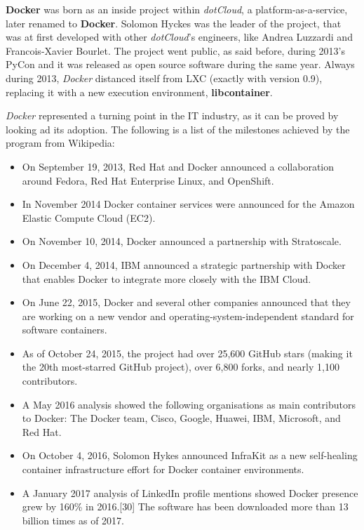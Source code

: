 \documentclass[a4paper,12pt]{article}
\begin{document}
\textbf{Docker} was born as an inside project within \textit{dotCloud}, a
platform-as-a-service, later renamed to \textbf{Docker}. Solomon
Hyckes\cite{solomon_hyckes_wiki} was the leader of the project, that was at
first developed with other \textit{dotCloud}'s engineers, like Andrea Luzzardi
and Francois-Xavier Bourlet. The project went public, as said before, during
2013's PyCon and it was released as open source software during the same year.
Always during 2013, \textit{Docker} distanced itself from LXC (exactly with
version 0.9), replacing it with a new execution environment,
\textbf{libcontainer}.\par \textit{Docker} represented a turning point in the
IT industry, as it can be proved by looking ad its adoption. The following is a
list of the milestones achieved by the program from
Wikipedia\cite{docker_history_wiki}:
\begin{itemize}
  \item On September 19, 2013, Red Hat and Docker announced a collaboration
  around Fedora, Red Hat Enterprise Linux, and OpenShift.
  \item In November 2014 Docker container services were announced for the Amazon
  Elastic Compute Cloud (EC2).
  \item On November 10, 2014, Docker announced a partnership with
  Stratoscale.
  \item On December 4, 2014, IBM announced a strategic partnership with Docker
  that enables Docker to integrate more closely with the IBM Cloud.
  \item On June 22, 2015, Docker and several other companies announced that they
  are working on a new vendor and operating-system-independent standard for
  software containers.
  \item As of October 24, 2015, the project had over 25,600 GitHub stars (making
  it the 20th most-starred GitHub project), over 6,800 forks, and nearly 1,100
  contributors.
  \item A May 2016 analysis showed the following organisations as main
  contributors to Docker: The Docker team, Cisco, Google, Huawei, IBM,
  Microsoft, and Red Hat.
  \item On October 4, 2016, Solomon Hykes announced InfraKit as a new
  self-healing container infrastructure effort for Docker container
  environments.
  \item A January 2017 analysis of LinkedIn profile mentions showed Docker
  presence grew by 160\% in 2016.[30] The software has been downloaded more than
  13 billion times as of 2017.

\end{itemize}   
\end{document}
